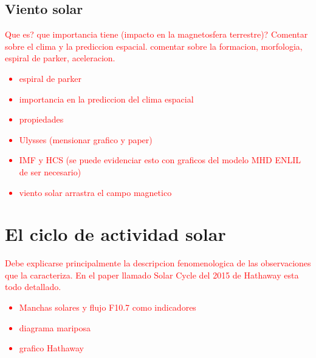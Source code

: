 \subsection{Viento solar}
\textcolor{red}{
Que es? que importancia tiene (impacto en la magnetosfera terrestre)? Comentar sobre el clima y la prediccion espacial. comentar sobre la formacion, morfologia, espiral de parker, aceleracion.
\begin{itemize}
  \item espiral de parker
  \item importancia en la prediccion del clima espacial
  \item propiedades
  \item Ulysses (mensionar grafico y paper)
  \item IMF y HCS (se puede evidenciar esto con graficos del modelo MHD ENLIL de ser necesario)
  \item viento solar arrastra el campo magnetico
\end{itemize}
}

\section{El ciclo de actividad solar}
\textcolor{red}{
Debe explicarse principalmente la descripcion fenomenologica de las observaciones que la caracteriza. En el paper llamado Solar Cycle del 2015 de Hathaway esta todo detallado.
\begin{itemize}
  \item Manchas solares y flujo F10.7 como indicadores
  \item diagrama mariposa
  \item grafico Hathaway
\end{itemize}
}


